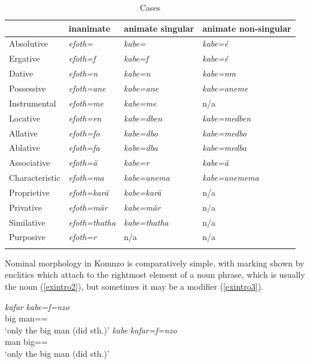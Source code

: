 \begin{table}
\caption{Cases}
\label{caseefothkabe}
	\begin{tabularx}{\textwidth}{Xlll}
	\lsptoprule
		&inanimate&animate singular& animate non-singular\\
		\midrule 
		Absolutive&\emph{efoth=\Zero}&\emph{kabe=\Zero}&\emph{kabe=é}\\
		Ergative&\emph{efoth=f}&\emph{kabe=f}&\emph{kabe=é}\\
		Dative&\emph{efoth=n}&\emph{kabe=n}&\emph{kabe=nm}\\
		Possessive&\emph{efoth=ane}&\emph{kabe=ane}&\emph{kabe=aneme}\\
		Instrumental&\emph{efoth=me}&\emph{kabe=me}&n/a\\
		Locative&\emph{efoth=en}&\emph{kabe=dben}&\emph{kabe=medben}\\
		Allative&\emph{efoth=fo}&\emph{kabe=dbo}&\emph{kabe=medbo}\\
		Ablative&\emph{efoth=fa}&\emph{kabe=dba}&\emph{kabe=medba}\\
		Associative&\emph{efoth=ä}&\emph{kabe=r}&\emph{kabe=ä}\\
		Characteristic&\emph{efoth=ma}&\emph{kabe=anema}&\emph{kabe=anemema}\\
		Proprietive&\emph{efoth=karä}&\emph{kabe=karä}&n/a\\
		Privative&\emph{efoth=mär}&\emph{kabe=mär}&n/a\\
		Similative&\emph{efoth=thatha}&\emph{kabe=thatha}&n/a\\
		Purposive&\emph{efoth=r}&n/a&n/a\\
		\lspbottomrule
	\end{tabularx}
\end{table}

Nominal morphology in Komnzo is comparatively simple, with  marking shown by enclitics which attach to the rightmost element of a noun phrase, which is usually the  noun (\ref{exintro2}), but sometimes it may be a modifier (\ref{exintro3}).

\begin{exe}
	\ex \label{exintro}
	\begin{xlist}
		\ex
		\gll \emph{kafar} \emph{kabe=f=nzo}\\
		big man=\Erg=\Only\\
		\trans `only the big man (did sth.)'
		\label{exintro2}
		\ex
		\gll \emph{kabe} \emph{kafar=f=nzo}\\
		man big=\Erg=\Only\\
		\trans `only the big man (did sth.)'
		\label{exintro3}
	\end{xlist}

\end{exe}

